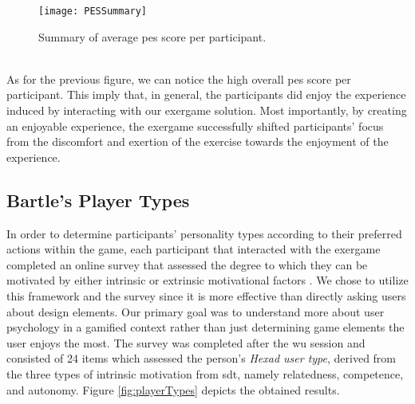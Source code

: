 \begin{figure}[h]
    \centering
    \texttt{[image: PESSummary]}
    \caption{Summary of average \acrshort{pes} score per participant.}
    \label{fig:pes}
\end{figure}\\
As for the previous figure, we can notice the high overall \acrshort{pes} score per participant. This imply that, in general, the participants did enjoy the experience induced by interacting with our exergame solution. Most importantly, by creating an enjoyable experience,  the exergame successfully shifted participants' focus from the discomfort and exertion of the exercise towards the enjoyment of the experience. 
\subsection{Bartle's Player Types}
In order to determine participants' personality types according to their preferred actions within the game, each participant that interacted with the exergame completed an online survey that assessed the degree to which they can be motivated by either intrinsic or extrinsic motivational factors \cite{tondello2016gamification}. We chose to utilize this framework and the survey since it is more effective than directly asking users about design elements. Our primary goal was to understand more about user psychology in a gamified context rather than just determining game elements the user enjoys the most. The survey was completed after the \acrshort{wu} session and consisted of 24 items which assessed the person's \textit{Hexad user type}, derived from the three types of intrinsic motivation from \acrshort{sdt}, namely relatedness, competence, and autonomy. Figure \ref{fig:playerTypes} depicts the obtained results. 
